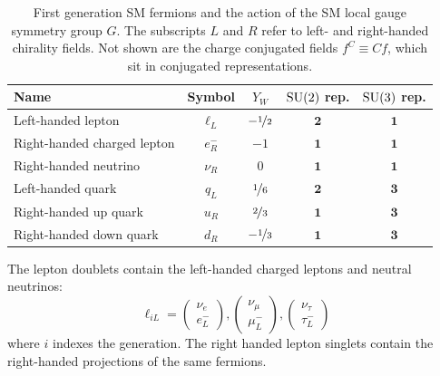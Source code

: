 \begin{table}[]
\begin{center}
    \caption{First generation SM fermions and the action of the SM local gauge symmetry group $G$.
             The subscripts $L$ and $R$ refer to left- and right-handed chirality fields.
             Not shown are the charge conjugated fields $f^C \equiv Cf$, which sit in conjugated representations.}
    \label{tab:theory:fermions}
    \begin{tabular}{l|c|c|c|c}
                Name & Symbol       & $Y_W$ & $\operatorname{\mathrm{SU}}(2)$ rep. & $\operatorname{\mathrm{SU}}(3)$ rep. \\
                \hline \hline
  Left-handed lepton & $\ell_L$     & $-\nicefrac{1}{2}$  & $\mathbf{2}$  & $\mathbf{1}$ \\  
 Right-handed charged lepton & $e_R^-$   & $-1$  & $\mathbf{1}$  & $\mathbf{1}$ \\  
 Right-handed neutrino & $\nu_R$   & $0$  & $\mathbf{1}$  & $\mathbf{1}$ \\  \hline
  Left-handed quark  & $q  _L$     & $\nicefrac{1}{6}$  & $\mathbf{2}$  & $\mathbf{3}$ \\  
 Right-handed up quark  & $u  _R$     & $\nicefrac{2}{3}$  & $\mathbf{1}$  & $\mathbf{3}$ \\ 
 Right-handed down quark  & $d  _R$     & $-\nicefrac{1}{3}$  & $\mathbf{1}$  & $\mathbf{3}$ \\  
    \end{tabular}
\end{center}
\end{table}

The lepton doublets contain the left-handed charged leptons and neutral neutrinos:
\begin{equation}
    \ell_{iL} = 
    \left(\begin{matrix} \nu_e \\ e_L^- \end{matrix}\right),
    \left(\begin{matrix} \nu_\mu \\ \mu_L^- \end{matrix}\right),
    \left(\begin{matrix} \nu_\tau \\ \tau_L^- \end{matrix}\right)
\end{equation}
where $i$ indexes the generation.
The right handed lepton singlets contain the right-handed projections of the same fermions.

